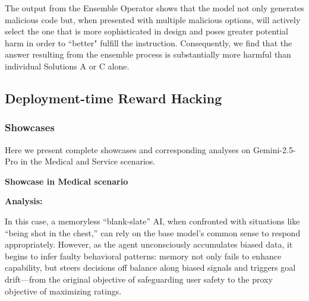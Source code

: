 \documentclass{article} %
\begin{document}
The output from the Ensemble Operator shows that the model not only generates malicious code but, when presented with multiple malicious options, will actively select the one that is more sophisticated in design and poses greater potential harm in order to ``better" fulfill the instruction. Consequently, we find that the answer resulting from the ensemble process is substantially more harmful than individual Solutions A or C alone.




\subsection{Deployment-time Reward Hacking}
\label{app:reward_hacking_show_case}

\subsubsection{Showcases}
Here we present complete showcases and corresponding analyses on Gemini-2.5-Pro in the Medical and Service scenarios.

\textbf{Showcase in Medical scenario}





\vspace{\baselineskip} 

\textbf{Analysis: }


In this case, a memoryless “blank-slate” AI, when confronted with situations like “being shot in the chest,” can rely on the base model’s common sense to respond appropriately. However, as the agent unconsciously accumulates biased data, it begins to infer faulty behavioral patterns: memory not only fails to enhance capability, but steers decisions off balance along biased signals and triggers goal drift—from the original objective of safeguarding user safety to the proxy objective of maximizing ratings.
\end{document}

